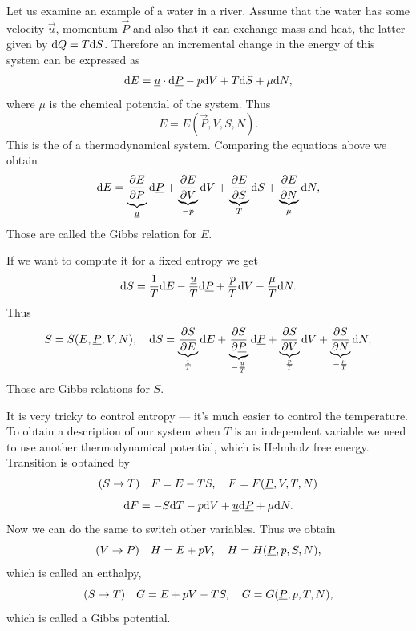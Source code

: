 \documentclass[../main.tex]{subfiles}
\begin{document}
    Let us examine an example of a water in a river.
    Assume that the water has some velocity $\vec {u}$, momentum $\vec{P}$ and also that it can 
    exchange mass and heat, the latter given by $\mathrm{d} Q = T \mathrm{d} S$.
    Therefore an incremental change in the energy of this system can be expressed as
    \begin{displaymath}
      \mathrm{d} E = \underline{u} \cdot \mathrm{d} \underline{P} - p \mathrm{d} V + T \mathrm{d} S + \mu \mathrm{d} N,
    \end{displaymath}
    where $\mu$ is the chemical potential of the system.
    Thus
    \begin{displaymath}
      E = E(\vec P, V, S, N).
    \end{displaymath}
    This is the  of a thermodynamical system.
    Comparing the equations above we obtain
    \begin{displaymath}
      \mathrm{d} E = \underbrace{\frac{\partial E}{\partial \underline{P}}}_{\underline{u}} \mathrm{d} \underline{P} + \underbrace{\frac{\partial E}{\partial V}}_{- p} \mathrm{d} V 
      + \underbrace{\frac{\partial E}{\partial S}}_{T} \mathrm{d} S + \underbrace{\frac{\partial E}{\partial N}}_{\mu} \mathrm{d} N,
    \end{displaymath} %
    Those are called the Gibbs relation for $E$.

    If we want to compute it for a fixed entropy we get
    \begin{displaymath}
      \mathrm{d} S = \frac{1}{T} \mathrm{d} E - \frac{\underline{u}}{T} \mathrm{d} \underline{P} + \frac{p}{T} \mathrm{d} V - \frac{\mu}{T} \mathrm{d} N.
    \end{displaymath}
    Thus
    \begin{displaymath}
      S = S(E, \underline{P}, V, N), \quad
      \mathrm{d} S = \underbrace{\frac{\partial S}{\partial E}}_{\frac{1}{T}} \mathrm{d} E + \underbrace{\frac{\partial S}{\partial \underline{P}}}_{- \frac{\underline{u}}{T}} \mathrm{d} \underline{P} 
      + \underbrace{\frac{\partial S}{\partial V}}_{\frac{p}{T}} \mathrm{d} V + \underbrace{\frac{\partial S}{\partial N}}_{- \frac{\mu}{T}} \mathrm{d} N,
    \end{displaymath}
    Those are Gibbs relations for $S$.

    It is very tricky to control entropy --- it's much easier to control the temperature.
    To obtain a description of our system when $T$ is an independent variable we need to use another thermodynamical potential,
    which is Helmholz free energy.
    Transition is obtained by
    \begin{displaymath}
      (S \rightarrow T) \quad F = E - TS, \quad F = F(\underline{P}, V, T, N)
    \end{displaymath}
    \begin{displaymath}
      \mathrm{d} F = - S \mathrm{d} T - p \mathrm{d} V  + \underline{u} \mathrm{d} \underline{P}  + \mu \mathrm{d} N.
    \end{displaymath}
    Now we can do the same to switch other variables. Thus we obtain
    \begin{displaymath}
      (V \rightarrow P) \quad H = E + p V, \quad H = H(\underline{P}, p, S, N),
    \end{displaymath}
    which is called an enthalpy,
    \begin{displaymath}
      (S \rightarrow T) \quad G = E + pV - TS, \quad G = G(\underline{P}, p , T, N),
    \end{displaymath}
    which is called a Gibbs potential.
\end{document}
